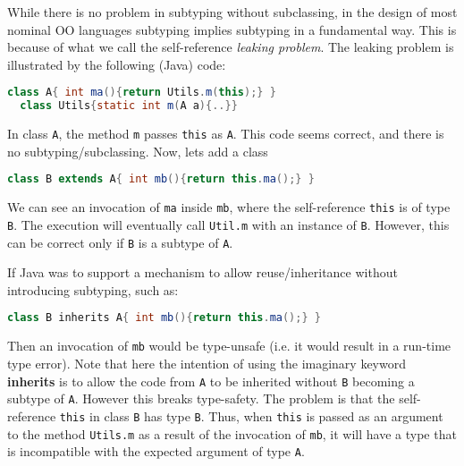 While there is no problem in subtyping without subclassing, in the design
of most nominal OO languages subtyping implies subtyping in a
fundamental way. This is because of what we call the self-reference
\emph{leaking problem}. The leaking problem is illustrated by the following
(Java) code:

\begin{lstlisting}[language=Java]
  class A{ int ma(){return Utils.m(this);} }
  class Utils{static int m(A a){..}}
\end{lstlisting}

In class \lstinline{A}, the method \lstinline{m} passes \lstinline{this} as \lstinline{A}.
This code seems correct, and there is no subtyping/subclassing.
Now, lets add a class \Q@B@

\begin{lstlisting}[language=Java]
  class B extends A{ int mb(){return this.ma();} }  
\end{lstlisting}

We can see an invocation of \lstinline{ma} inside
\lstinline{mb}, where the self-reference \lstinline{this} is of type \lstinline{B}. 
The execution will eventually call \lstinline{Util.m} with an
instance of \lstinline{B}. However, this can be correct only if \lstinline{B} is a subtype of
\lstinline{A}. 

If Java was to support a mechanism to allow reuse/inheritance 
without introducing subtyping, such as:

\begin{lstlisting}[language=Java]
  class B inherits A{ int mb(){return this.ma();} }
\end{lstlisting}

\noindent Then an invocation of 
\lstinline{mb} would be type-unsafe (i.e. it would 
result in a run-time type error). 
Note that here the intention of using the imaginary keyword {\bf
  inherits} is to allow the code from \lstinline{A} to be inherited 
without \lstinline{B} becoming a subtype of \lstinline{A}. 
However this breaks type-safety. The problem is that the
self-reference \lstinline{this} in class \lstinline{B} has 
type \lstinline{B}. Thus, when \lstinline{this} is passed as an argument to 
the method \lstinline{Utils.m} as a result of the invocation of
\lstinline{mb}, it will have a type that is incompatible with the
expected argument of type \lstinline{A}.  

